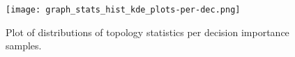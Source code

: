 \documentclass{report}
\numberwithin{equation}{section}
\numberwithin{figure}{section}
\numberwithin{table}{section}
\numberwithin{algorithm}{section}
\begin{document}
\begin{figure}[H]
  \texttt{[image: graph\_stats\_hist\_kde\_plots-per-dec.png]}
  \caption{Plot of distributions of topology statistics 
  per decision importance samples.}
\end{figure}


\end{document}
